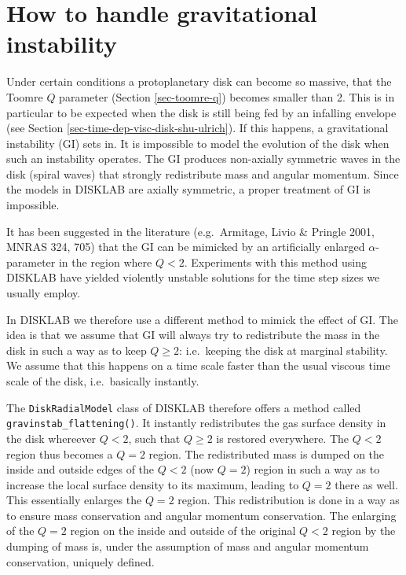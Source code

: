 \documentclass{book}
\newcommand{\code}[1]{{\small\tt #1}}
\begin{document}
\section{How to handle gravitational instability}
\label{sec-grav-instab}
%
Under certain conditions a protoplanetary disk can become so massive, that the
Toomre $Q$ parameter (Section \ref{sec-toomre-q}) becomes smaller than 2. This
is in particular to be expected when the disk is still being fed by an infalling
envelope (see Section \ref{sec-time-dep-visc-disk-shu-ulrich}). If this happens,
a gravitational instability (GI) sets in. It is impossible to model the
evolution of the disk when such an instability operates. The GI produces
non-axially symmetric waves in the disk (spiral waves) that strongly
redistribute mass and angular momentum. Since the models in {\sf DISKLAB} are
axially symmetric, a proper treatment of GI is impossible.

It has been suggested in the literature (e.g.~Armitage, Livio \& Pringle 2001,
MNRAS 324, 705) that the GI can be mimicked by an artificially enlarged
$\alpha$-parameter in the region where $Q<2$. Experiments with this method
using {\sf DISKLAB} have yielded violently unstable solutions for the time
step sizes we usually employ.

In {\sf DISKLAB} we therefore use a different method to mimick the effect of
GI. The idea is that we assume that GI will always try to redistribute the mass
in the disk in such a way as to keep $Q\ge 2$: i.e.\ keeping the disk at
marginal stability. We assume that this happens on a time scale faster than the
usual viscous time scale of the disk, i.e.\ basically instantly.

The \code{DiskRadialModel} class of {\sf DISKLAB} therefore offers a method
called \code{gravinstab\_flattening()}. It instantly redistributes the gas
surface density in the disk whereever $Q<2$, such that $Q\ge 2$ is restored
everywhere. The $Q<2$ region thus becomes a $Q=2$ region.  The redistributed
mass is dumped on the inside and outside edges of the $Q<2$ (now $Q=2$) region
in such a way as to increase the local surface density to its maximum, leading
to $Q=2$ there as well. This essentially enlarges the $Q=2$ region. This
redistribution is done in a way as to ensure mass conservation and angular
momentum conservation. The enlarging of the $Q=2$ region on the inside and
outside of the original $Q<2$ region by the dumping of mass is, under the
assumption of mass and angular momentum conservation, uniquely defined.
\end{document}
